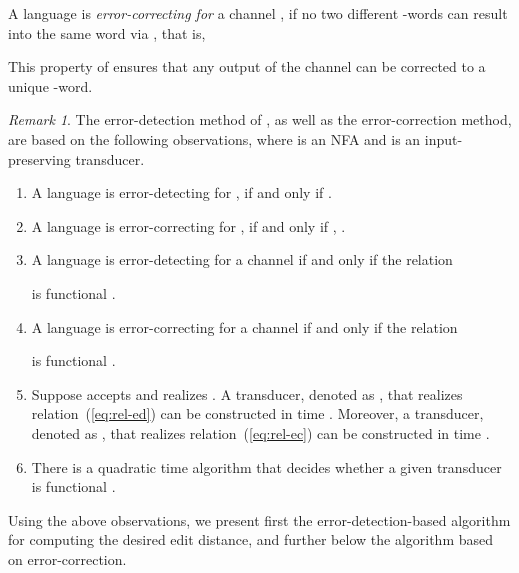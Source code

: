 \documentclass{article}
\theoremstyle{plain}
\theoremstyle{definition}
\theoremstyle{remark}
\newtheorem{remark}[theorem]{Remark}
\begin{document}
A language  is \emph{error-correcting for} a channel , if no two different -words can result into the same word via , that is,

This property of  ensures that any output  of the
channel can be corrected to a unique -word.


\begin{remark}\label{rem:ed}
The error-detection method of \cite{KonSil:2010}, as well as the error-correction method, are based on the
following observations, where  is an NFA
and  is an input-preserving transducer.
\begin{enumerate}
  \item
   A language  is error-detecting for ,
   if and only if
   .
  \item
   A language  is error-correcting for ,
   if and only if
   ,  \cite{Levenshtein:66:en}.
  \item
  A language  is error-detecting for a channel
   if and only if the relation
  
  is functional \cite{Kon:2002}.
  \item
  A language  is error-correcting for a channel
   if and only if the relation
  
  is functional \cite{Kon:2002}.
  \item
  Suppose  accepts  and  realizes .
  A transducer, denoted as ,
  that realizes relation~(\ref{eq:rel-ed}) can be constructed
  in time .
  Moreover, a transducer, denoted as ,
  that realizes relation~(\ref{eq:rel-ec}) can be constructed
  in time  \cite{Kon:2002}.
  \item
  There is a quadratic time algorithm that decides whether a given transducer is functional \cite{AllMoh:2003,BeCaPrSa2003}.
\end{enumerate}
\end{remark}
Using the above observations, we present first
the error-detection-based algorithm for computing
the desired edit distance, and further below the algorithm based on error-correction.
\end{document}
